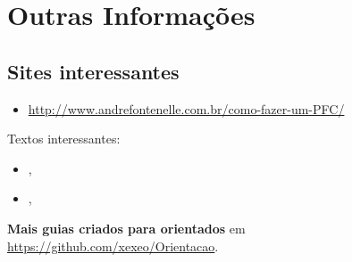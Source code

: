 \chapter{Outras Informações}

\section{Sites interessantes}
\begin{itemize}
    \item \url{http://www.andrefontenelle.com.br/como-fazer-um-PFC/}
\end{itemize}

Textos interessantes:
\begin{itemize}
    \item  {}, \citet{desordi:2017}
    \item  {}, \citet{ellis:2008}
\end{itemize}

\textbf{Mais guias criados para orientados} em \url{https://github.com/xexeo/Orientacao}.

